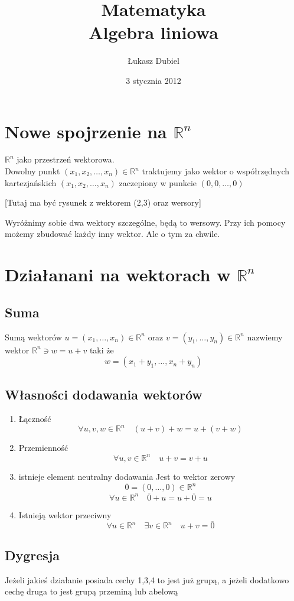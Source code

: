 \documentclass[11pt]{article}
\author{Łukasz Dubiel}
\title{Matematyka \\ Algebra liniowa}
\date{3 stycznia 2012}
\begin{document}
\maketitle

\section{Nowe spojrzenie na $\mathbb{R}^n$}
$\mathbb{R}^n$ jako przestrzeń wektorowa. \\
Dowolny punkt $(x_1,x_2, \ldots , x_n) \in \mathbb{R}^n$ traktujemy jako wektor o współrzędnych kartezjańskich $(x_1,x_2, \ldots , x_n) $ zaczepiony w punkcie $(0,0,\ldots,0)$

[Tutaj ma być rysunek z wektorem (2,3) oraz wersory] 

Wyróżnimy sobie dwa wektory szczególne, będą to wersowy.
Przy ich pomocy możemy zbudować każdy inny wektor. Ale o tym za chwile.
\section{Działanani na wektorach w $\mathbb{R}^n$}
\subsection{Suma}
Sumą wektorów $u = (x_1,\ldots,x_n) \in \mathbb{R}^n$ oraz $v = (y_1,\ldots, y_n) \in \mathbb{R}^n$ nazwiemy wektor $ \mathbb{R}^n \ni w = u + v$ taki że $$ w = (x_1 + y_1 , \ldots , x_n + y_n)$$

\subsection{Własności dodawania wektorów}
\begin{enumerate}
\item{Łączność}
$$ \forall u,v,w \in \mathbb{R}^n \quad (u+v)+w = u + ( v + w) $$
\item{Przemienność}
$$ \forall u,v \in \mathbb{R}^n \quad u+v = v + u $$
\item{istnieje element neutralny dodawania}
Jest to wektor zerowy $$ \overline{0} = (0,\ldots,0) \in \mathbb{R}^n$$
$$ \forall u \in \mathbb{R}^n \quad \overline{0} + u = u + \overline{0} = u $$
\item{Istnieją wektor przeciwny}
$$ \forall u \in \mathbb{R}^n \quad \exists v \in \mathbb{R}^n \quad u + v = \overline{0}$$
\end{enumerate}

\subsection{Dygresja}
Jeżeli jakieś działanie posiada cechy 1,3,4 to jest już grupą, a jeżeli dodatkowo cechę druga to jest grupą przeminą lub abelową
\end{document}
